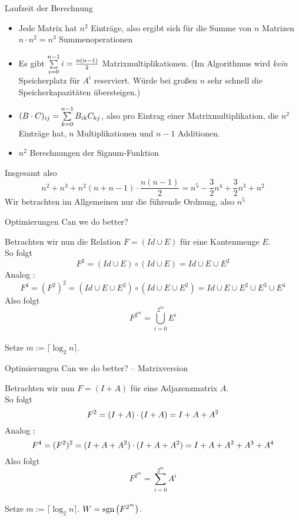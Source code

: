 \begin{frame}{Laufzeit der Berechnung}
	\begin{itemize}[<+->]
		\item Jede Matrix hat $n^2$ Einträge, also ergibt sich für die Summe von $n$ Matrizen $n\cdot n^2=n^3$ Summenoperationen 
		\item  Es gibt $\sum\limits_{i=0}^{n-1} i = \frac{n(n-1)}{2} $ Matrixmultiplikationen. (Im Algorithmus wird \emph{kein} Speicherplatz für $A^i$ reserviert. Würde bei großen $n$ sehr schnell die Speicherkapazitäten übersteigen.) 
		\item $(B\cdot C)_{ij} = \sum\limits_{k=0}^{n-1} B_{ik} C_{kj}$, also pro Eintrag einer Matrixmultiplikation, die $n^2$ Einträge hat, $n$ Multiplikationen und $n-1$ Additionen. 
		\item $n^2$ Berechnungen der Signum-Funktion 
	\end{itemize}
	\pause
	Insgesamt also $$ n^2 + n^3 + n^2(n+n-1)\cdot \frac{n(n-1)}{2} = n^5 - \frac{3}{2} n^4 + \frac{3}{2} n^3 + n^2 $$
	Wir betrachten im Allgemeinen nur die führende Ordnung, also $n^5$
\end{frame}

\begin{frame}{Optimierungen}
	Can we do better? \pause
	\bigskip
	
	Betrachten wir nun die Relation $ F = (Id \cup E) $ für eine Kantenmenge $E$. \\  \pause 
	So folgt $$ F^2 = (Id \cup E) \circ (Id \cup E) = Id \cup E \cup E^2 $$ \pause
	Analog : $$ F^4 = (F^2)^2 = (Id\cup E \cup E^2) \circ (Id\cup E\cup E^2) = Id \cup E \cup E^2 \cup E^3 \cup E^4 $$ \pause 
	Also folgt $$ F^{2^m} = \bigcup\limits_{i=0}^{2^m} E^i$$ \\
	Setze $m := \lceil \log_2 n \rceil $.
\end{frame}

\begin{frame}{Optimierungen}
	Can we do better? – Matrixversion \pause
	\bigskip
	
	Betrachten wir nun $ F = (I + A) $ für eine Adjazenzmatrix $A$. \\  \pause 
	So folgt $$ F^2 = (I + A) \cdot (I + A) = I + A + A^2 $$ \pause
	Analog : $$ F^4 = (F^2)^2 = (I + A + A^2) \cdot (I + A + A^2) = I + A + A^2 + A^3 + A^4 $$ \pause 
	Also folgt $$ F^{2^m} = \sum\limits_{i=0}^{2^m} A^i$$ \\
	Setze $m := \lceil \log_2 n \rceil $. \pause \impl $W = \mathop{\text{sgn}}\big(F^{2^m}\big)$.
\end{frame}


